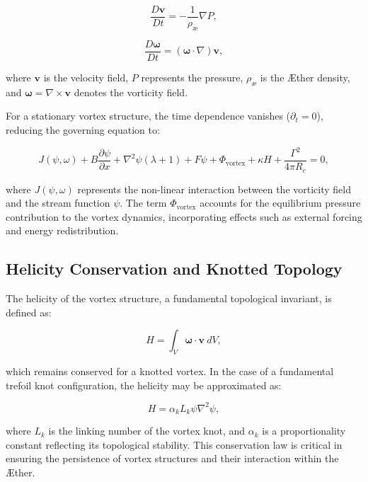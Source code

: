 \documentclass[a4paper,10pt]{article}
\begin{document}
\begin{equation*}
\frac{D \mathbf{v}}{Dt} = -\frac{1}{\rho_\text{\ae}} \nabla P,
\end{equation*}

\begin{equation*}
\frac{D \boldsymbol{\omega}}{Dt} = (\boldsymbol{\omega} \cdot \nabla) \mathbf{v},
\end{equation*}

where $\mathbf{v}$ is the velocity field, $P$ represents the pressure, $\rho_\text{\ae}$ is the Æther density, and $\boldsymbol{\omega} = \nabla \times \mathbf{v}$ denotes the vorticity field.

For a stationary vortex structure, the time dependence vanishes ($\partial_t = 0$), reducing the governing equation to:

\begin{equation*}
J(\psi, \omega) + B \frac{\partial \psi}{\partial x} + \nabla^2 \psi (\lambda + 1) + F \psi + \Phi_\text{vortex} + \kappa H + \frac{\Gamma^2}{4 \pi R_c} = 0,
\end{equation*}

where $J(\psi, \omega)$ represents the non-linear interaction between the vorticity field and the stream function $\psi$. The term $\Phi_\text{vortex}$ accounts for the equilibrium pressure contribution to the vortex dynamics, incorporating effects such as external forcing and energy redistribution.

\subsection{Helicity Conservation and Knotted Topology}
The helicity of the vortex structure, a fundamental topological invariant, is defined as:

\begin{equation*}
H = \int_V \boldsymbol{\omega} \cdot \mathbf{v} \ dV,
\end{equation*}

which remains conserved for a knotted vortex. In the case of a fundamental trefoil knot configuration, the helicity may be approximated as:

\begin{equation*}
H = \alpha_k L_k \psi \nabla^2 \psi,
\end{equation*}

where $L_k$ is the linking number of the vortex knot, and $\alpha_k$ is a proportionality constant reflecting its topological stability. This conservation law is critical in ensuring the persistence of vortex structures and their interaction within the Æther.
\end{document}
